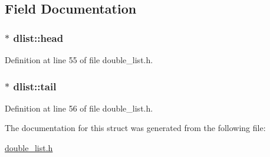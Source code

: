 \subsection{Field Documentation}
\hypertarget{structdlist_a8b41eb6a98fac7979652003285f65313}{}
\subsubsection[{head}]{$\ast$ dlist\+::head}\label{structdlist_a8b41eb6a98fac7979652003285f65313}


Definition at line 55 of file double\+\_\+list.\+h.

\hypertarget{structdlist_af47038909dd24dd5205cbb96509a48bf}{}
\subsubsection[{tail}]{$\ast$ dlist\+::tail}\label{structdlist_af47038909dd24dd5205cbb96509a48bf}


Definition at line 56 of file double\+\_\+list.\+h.



The documentation for this struct was generated from the following file\+:\begin{DoxyCompactItemize}
\item 
\hyperlink{double__list_8h}{double\+\_\+list.\+h}\end{DoxyCompactItemize}
